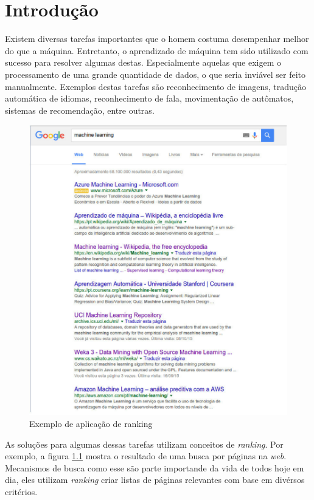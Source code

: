 \chapter{Introdução}

Existem diversas tarefas importantes que o homem costuma desempenhar melhor do que a máquina.
Entretanto, o aprendizado de máquina tem sido utilizado com sucesso para resolver algumas destas.
Especialmente aquelas que exigem o processamento de uma grande quantidade de dados, o que seria inviável ser feito manualmente.
Exemplos destas tarefas são reconhecimento de imagens, tradução automática de idiomas, reconhecimento de fala, movimentação de autômatos, sistemas de recomendação, entre outras.

\begin{figure}[h!]
  \includegraphics[width=\linewidth]{images/intro01.eps}
  \caption{Exemplo de aplicação de ranking}
  \label{fig:metodoproposto01}
\end{figure}

As soluções para algumas dessas tarefas utilizam conceitos de \textit{ranking}.
Por exemplo, a figura \ref{fig:metodoproposto01} mostra o resultado de uma busca por páginas na \textit{web}.
Mecanismos de busca como esse são parte importande da vida de todos hoje em dia, eles utilizam \textit{ranking} criar listas de páginas relevantes com base em divérsos critérios.

